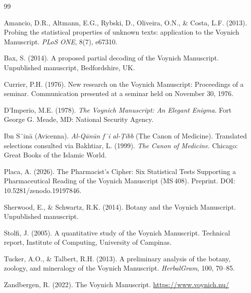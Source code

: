 \documentclass[11pt,a4paper]{article}
\begin{document}
\begin{thebibliography}{99}

Amancio, D.R., Altmann, E.G., Rybski, D., Oliveira, O.N., \& Costa, L.F. (2013). Probing the statistical properties of unknown texts: application to the Voynich Manuscript. \textit{PLoS ONE}, 8(7), e67310.

Bax, S. (2014). A proposed partial decoding of the Voynich Manuscript. Unpublished manuscript, Bedfordshire, UK.

Currier, P.H. (1976). New research on the Voynich Manuscript: Proceedings of a seminar. Communication presented at a seminar held on November 30, 1976.

D'Imperio, M.E. (1978). \textit{The Voynich Manuscript: An Elegant Enigma}. Fort George G. Meade, MD: National Security Agency.

Ibn S\={\ i}n\=a (Avicenna). \textit{Al-Q\=an\=un f\={\ i} al-\d{T}ibb} (The Canon of Medicine). Translated selections consulted via Bakhtiar, L. (1999). \textit{The Canon of Medicine}. Chicago: Great Books of the Islamic World.

Placa, A. (2026). The Pharmacist's Cipher: Six Statistical Tests Supporting a Pharmaceutical Reading of the Voynich Manuscript (MS\,408). Preprint. DOI: 10.5281/zenodo.19197846.

Sherwood, E., \& Schwartz, R.K. (2014). Botany and the Voynich Manuscript. Unpublished manuscript.

Stolfi, J. (2005). A quantitative study of the Voynich Manuscript. Technical report, Institute of Computing, University of Campinas.

Tucker, A.O., \& Talbert, R.H. (2013). A preliminary analysis of the botany, zoology, and mineralogy of the Voynich Manuscript. \textit{HerbalGram}, 100, 70--85.

Zandbergen, R. (2022). The Voynich Manuscript. \url{https://www.voynich.nu/}

\end{thebibliography}
\end{document}
